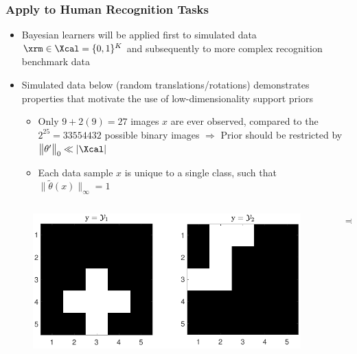 \documentclass[aspectratio=169,usenames,dvipsnames]{beamer}
\begin{document}
\begin{frame}
\frametitle{Apply to Human Recognition Tasks}

\begin{itemize}
\item Bayesian learners will be applied first to \alert{simulated data} $\xrm \in \Xcal = \{0,1\}^K$ and subsequently to more complex recognition \alert{benchmark data}
\vspace{0.5em}
\item Simulated data below (random translations/rotations) demonstrates properties that motivate the use of \alert{low-dimensionality support} priors
	\vspace{0.25em}
	\begin{itemize}
	\item Only $9+2(9) = 27$ images $x$ are ever observed, compared to the $2^{25} = 33554432$ possible binary images $\Rightarrow$ Prior should be restricted by $\big\| \theta' \big\|_0 \ll |\Xcal|$ 
	\vspace{0.25em}
	\item Each data sample $x$ is unique to a single class, such that $\big\| \tilde{\theta}(x) \big\|_{\infty} = 1$
	\end{itemize}
\end{itemize}


\begin{columns}[c]
\hspace{2ex}
\begin{column}{.4\linewidth}
\begin{figure}
\centering
\includegraphics[width=1\linewidth]{character_sim_ex.pdf}
\end{figure}
\end{column}

\begin{column}{0.03\linewidth}
\Huge
$\Rightarrow$
\normalsize
\end{column}


\end{columns}
\end{frame}
\end{document}
